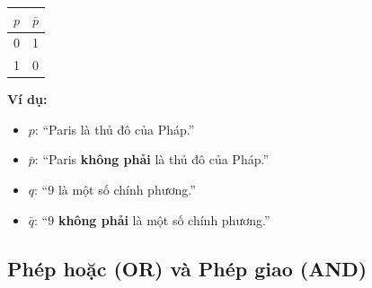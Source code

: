 \documentclass[12pt,a4paper]{article}
\begin{document}
\noindent
\begin{minipage}[c]{0.30\textwidth}
\centering
\renewcommand{\arraystretch}{1.2}
\begin{tabular}{|c|c|}
\hline
$p$ & $\bar{p}$ \\ \hline
0 & 1 \\ \hline
1 & 0 \\ \hline
\end{tabular}
\end{minipage}
\hfill
\begin{minipage}[c]{0.66\textwidth}
\textbf{Ví dụ:}
\begin{itemize}
  \item $p$: ``Paris là thủ đô của Pháp.''
  \item $\bar{p}$: ``Paris \textbf{không phải} là thủ đô của Pháp.''
  \item $q$: ``$9$ là một số chính phương.''
  \item $\bar{q}$: ``$9$ \textbf{không phải} là một số chính phương.''
\end{itemize}
\end{minipage}

\subsection{Phép hoặc (OR) và Phép giao (AND)}
\end{document}
